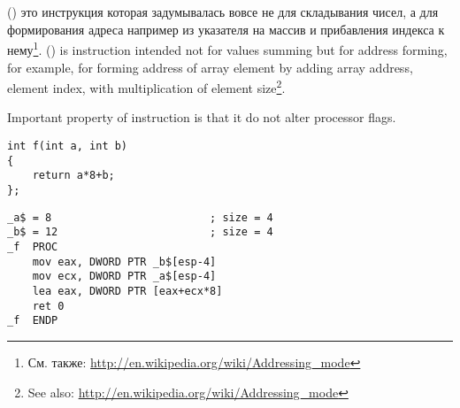 ﻿\section{}
\label{sec:LEA}

\newcommand{\URLAM}{\url{http://en.wikipedia.org/wiki/Addressing_mode}}

\IFRU
{\LEA () это инструкция которая задумывалась вовсе не для складывания чисел, 
а для формирования адреса например из указателя на массив и прибавления индекса к нему\footnote{См. также: \URLAM}.}
{\LEA () is instruction intended not for values summing but for address forming, 
for example, for forming address of array element by adding array address, element index, with 
multiplication of element size\footnote{See also: \URLAM}.}

{Important property of \LEA instruction is that it do not alter processor flags.}


\begin{lstlisting}
int f(int a, int b)
{
	return a*8+b;
};
\end{lstlisting}


\begin{lstlisting}
_a$ = 8							; size = 4
_b$ = 12						; size = 4
_f	PROC
	mov	eax, DWORD PTR _b$[esp-4]
	mov	ecx, DWORD PTR _a$[esp-4]
	lea	eax, DWORD PTR [eax+ecx*8]
	ret	0
_f	ENDP
\end{lstlisting}

